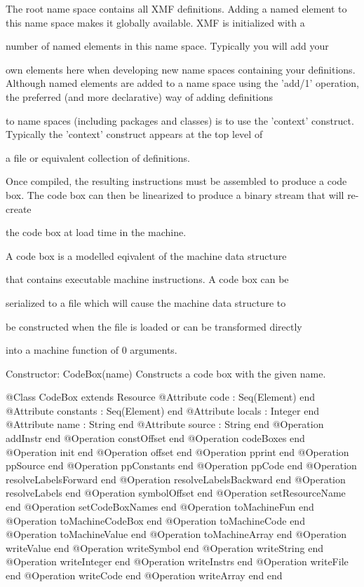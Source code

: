 
      The root name space contains all XMF definitions. Adding a named element to 
      this name space makes it globally available. XMF is initialized with a

      number of named elements in this name space. Typically you will add your

      own elements here when developing new name spaces containing your definitions.
      Although named elements are added to a name space using the 'add/1' 
      operation, the preferred (and more declarative) way of adding definitions

      to name spaces (including packages and classes) is to use the 'context'
      construct. Typically the 'context' construct appears at the top level of

      a file or equivalent collection of definitions.

      Once compiled, the resulting instructions must be assembled to produce a code box.
      The code box can then be linearized to produce a binary stream that will re-create

      the code box at load time in the machine.

         A code box is a modelled eqivalent of the machine data structure

         that contains executable machine instructions. A code box can be

         serialized to a file which will cause the machine data structure to

         be constructed when the file is loaded or can be transformed directly

         into a machine function of 0 arguments.
       
         Constructor: CodeBox(name)
           Constructs a code box with the given name.
\begin{Interface}
@Class CodeBox extends Resource
  @Attribute code : Seq(Element) end
  @Attribute constants : Seq(Element) end
  @Attribute locals : Integer end
  @Attribute name : String end
  @Attribute source : String end
  @Operation addInstr end
  @Operation constOffset end
  @Operation codeBoxes end
  @Operation init end
  @Operation offset end
  @Operation pprint end
  @Operation ppSource end
  @Operation ppConstants end
  @Operation ppCode end
  @Operation resolveLabelsForward end
  @Operation resolveLabelsBackward end
  @Operation resolveLabels end
  @Operation symbolOffset end
  @Operation setResourceName end
  @Operation setCodeBoxNames end
  @Operation toMachineFun end
  @Operation toMachineCodeBox end
  @Operation toMachineCode end
  @Operation toMachineValue end
  @Operation toMachineArray end
  @Operation writeValue end
  @Operation writeSymbol end
  @Operation writeString end
  @Operation writeInteger end
  @Operation writeInstrs end
  @Operation writeFile end
  @Operation writeCode end
  @Operation writeArray end
end
\end{Interface}

